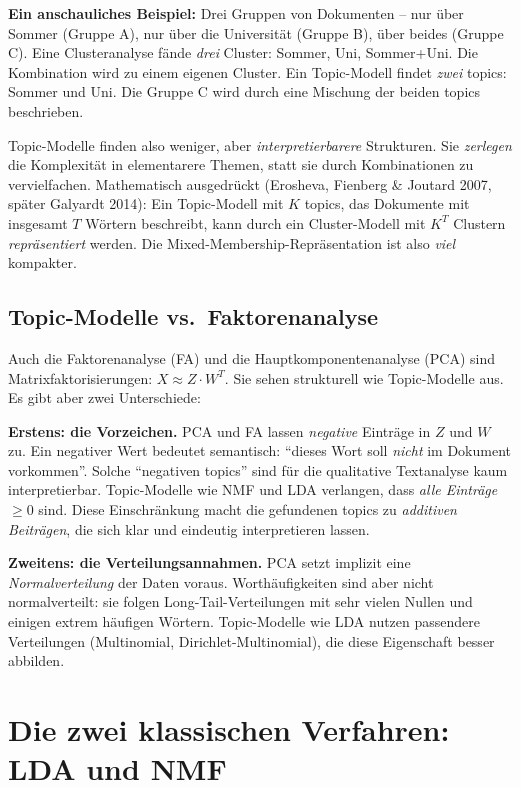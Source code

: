 \documentclass[a4paper,11pt]{article}
\begin{document}
\textbf{Ein anschauliches Beispiel:} Drei Gruppen von Dokumenten --
nur über Sommer (Gruppe A), nur über die Universität (Gruppe B), über
beides (Gruppe C). Eine Clusteranalyse fände \emph{drei} Cluster:
Sommer, Uni, Sommer+Uni. Die Kombination wird zu einem eigenen
Cluster. Ein Topic-Modell findet \emph{zwei} topics: Sommer und Uni.
Die Gruppe C wird durch eine Mischung der beiden topics beschrieben.

Topic-Modelle finden also weniger, aber \emph{interpretierbarere}
Strukturen. Sie \emph{zerlegen} die Komplexität in elementarere
Themen, statt sie durch Kombinationen zu vervielfachen. Mathematisch
ausgedrückt (Erosheva, Fienberg \& Joutard 2007, später Galyardt 2014):
Ein Topic-Modell mit $K$ topics, das Dokumente mit insgesamt $T$
Wörtern beschreibt, kann durch ein Cluster-Modell mit $K^T$ Clustern
\emph{repräsentiert} werden. Die Mixed-Membership-Repräsentation ist
also \emph{viel} kompakter.

\subsection{Topic-Modelle vs.\ Faktorenanalyse}

Auch die Faktorenanalyse (FA) und die Hauptkomponentenanalyse (PCA)
sind Matrixfaktorisierungen: $X \approx Z \cdot W^T$. Sie sehen
strukturell wie Topic-Modelle aus. Es gibt aber zwei Unterschiede:

\textbf{Erstens: die Vorzeichen.} PCA und FA lassen \emph{negative}
Einträge in $Z$ und $W$ zu. Ein negativer Wert bedeutet semantisch:
\enquote{dieses Wort soll \emph{nicht} im Dokument vorkommen}. Solche
\enquote{negativen topics} sind für die qualitative Textanalyse kaum
interpretierbar. Topic-Modelle wie NMF und LDA verlangen, dass
\emph{alle Einträge} $\geq 0$ sind. Diese Einschränkung macht die
gefundenen topics zu \emph{additiven Beiträgen}, die sich klar und
eindeutig interpretieren lassen.

\textbf{Zweitens: die Verteilungsannahmen.} PCA setzt implizit eine
\emph{Normalverteilung} der Daten voraus. Worthäufigkeiten sind aber
nicht normalverteilt: sie folgen Long-Tail-Verteilungen mit sehr
vielen Nullen und einigen extrem häufigen Wörtern. Topic-Modelle wie
LDA nutzen passendere Verteilungen (Multinomial, Dirichlet-Multinomial),
die diese Eigenschaft besser abbilden.

\section{Die zwei klassischen Verfahren: LDA und NMF}
\end{document}
